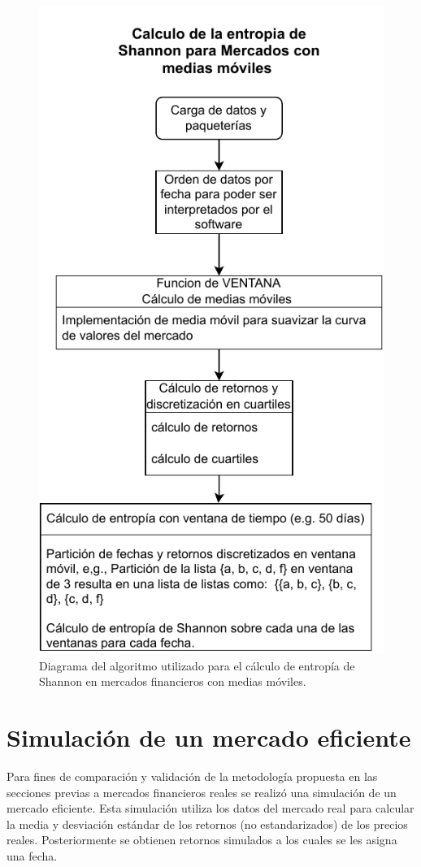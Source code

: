 \begin{figure}
	\centering
	\includegraphics[width=0.7\linewidth]{figures/entropiaMAV}
	\caption{Diagrama del algoritmo utilizado para el c\'alculo de entrop\'ia de Shannon en mercados financieros con medias m\'oviles.}
	\label{entropiamav}
\end{figure}



\section{Simulación de un mercado eficiente}

Para fines de comparación y validación de la metodología propuesta en las secciones previas a mercados financieros reales se realizó una simulación de un mercado eficiente.
Esta simulación utiliza los datos del mercado real para calcular la media y desviación estándar  de los retornos (no estandarizados) de los precios reales. 
Posteriormente se obtienen retornos simulados a los cuales se les asigna una fecha.

